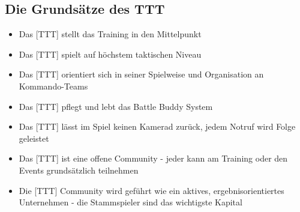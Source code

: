 \subsection*{Die Grundsätze des TTT}
	\begin{itemize}
		\item Das [TTT] stellt das Training in den Mittelpunkt
		\item Das [TTT] spielt auf höchstem taktischen Niveau
		\item Das [TTT] orientiert sich in seiner Spielweise und Organisation an Kommando-Teams
		\item Das [TTT] pflegt und lebt das Battle Buddy System
		\item Das [TTT] lässt im Spiel keinen Kamerad zurück, jedem Notruf wird Folge geleistet
		\item Das [TTT] ist eine offene Community - jeder kann am Training oder den Events grundsätzlich teilnehmen
		\item Die [TTT] Community wird geführt wie ein aktives, ergebnisorientiertes Unternehmen - die Stammspieler sind das wichtigste Kapital	
	\end{itemize}
